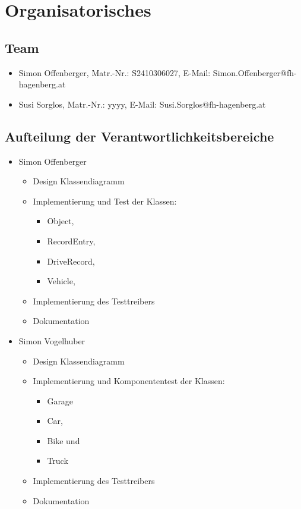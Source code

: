 \documentclass[12pt,naustrian,a4widepaper]{scrartcl}
\begin{document}
\section{Organisatorisches}

\subsection{Team}
\begin{itemize}
	\item Simon Offenberger, Matr.-Nr.: S2410306027, E-Mail: Simon.Offenberger@fh-hagenberg.at
	\item Susi Sorglos, Matr.-Nr.: yyyy, E-Mail: Susi.Sorglos@fh-hagenberg.at	
\end{itemize}

\subsection{Aufteilung der Verantwortlichkeitsbereiche}
\begin{itemize}
	\item Simon Offenberger
		\begin{itemize}
			\item Design Klassendiagramm
			\item Implementierung und Test der Klassen: 
			\begin{itemize}
				\item Object,
				\item RecordEntry, 
				\item DriveRecord,
				\item Vehicle,
			\end{itemize}
			\item Implementierung des Testtreibers
			\item Dokumentation
		\end{itemize}
	\item Simon Vogelhuber
		\begin{itemize}
			\item Design Klassendiagramm
			\item Implementierung und Komponententest der Klassen: 
			\begin{itemize}
				\item Garage
				\item Car, 
				\item Bike und  
				\item Truck 
			\end{itemize}
			\item Implementierung des Testtreibers
			\item Dokumentation
		\end{itemize}	
\end{itemize}
\end{document}
